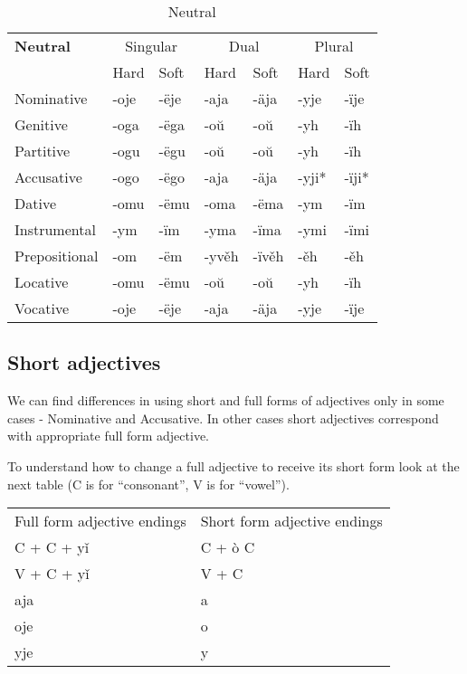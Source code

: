 \begin{table}[!htb]
	\caption{Neutral}
	\begin{tabular}{lllllll}
		\textbf{Neutral}       
		& \multicolumn{2}{c}{Singular} 
		& \multicolumn{2}{c}{Dual} 
		& \multicolumn{2}{c}{Plural} \\
		& Hard   & Soft  & Hard   & Soft   & Hard  & Soft \\
		Nominative    & -oje & -ëje     
		& -aja  & -äja        
		& -yje & -ïje \\
		Genitive      & -oga & -ëga 
		& -oŭ & -oŭ
		& -yh & -ïh \\
		Partitive     & -ogu & -ëgu 
		& -oŭ & -oŭ
		& -yh & -ïh \\
		Accusative    & -ogo & -ëgo     
		& -aja & -äja
		& -yji* & -ïji*  \\
		Dative		  & -omu & -ëmu
		& -oma & -ëma 
		& -ym & -ïm \\  
		Instrumental  & -ym & -ïm     
		& -yma & -ïma   
		& -ymi & -ïmi \\
		Prepositional & -om & -ëm  
		& -yvěh & -ïvěh     
		& -ěh & -ěh \\
		Locative      & -omu & -ëmu      
		& -oŭ & -oŭ
		& -yh & -ïh \\
		Vocative       & -oje & -ëje     
		& -aja  & -äja        
		& -yje & -ïje 
	\end{tabular}
\end{table}

\subsection{Short adjectives}

We can find differences in using short and full forms of adjectives only in some cases - Nominative and Accusative. In other cases short adjectives correspond with appropriate full form adjective.

To understand how to change a full adjective to receive its short form look at the next table (C is for “consonant”, V is for “vowel”).

\begin{table}
	\begin{tabular}{ll}
		Full form adjective endings & Short form adjective endings \\
		C + C + yǐ & C + ò C \\
	    V + C + yǐ & V + C \\
		aja & a \\
		oje  & o \\
		yje & y \\
	\end{tabular}
\end{table}

